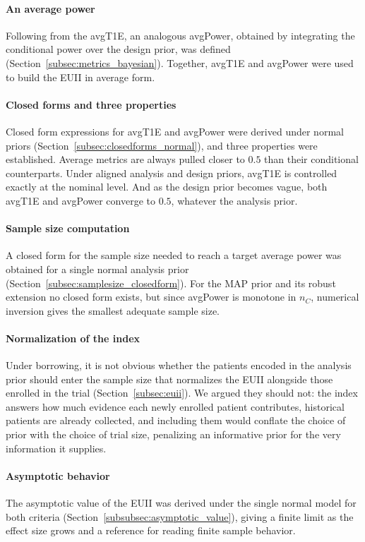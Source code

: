 \paragraph{An average power}
Following from the avgT1E, an analogous avgPower, obtained by integrating
the conditional power over the design prior, was defined
(Section~\ref{subsec:metrics_bayesian}). Together, avgT1E and avgPower were used to build the EUII in
average form.

\paragraph{Closed forms and three properties}
Closed form expressions for avgT1E and avgPower were derived under normal priors
(Section~\ref{subsec:closedforms_normal}), and three
properties were established. Average metrics are always pulled closer to $0.5$ than their conditional counterparts.
Under aligned analysis and design priors, avgT1E is controlled exactly at the nominal level. And as
the design prior becomes vague, both avgT1E and avgPower converge to $0.5$, whatever the analysis
prior.

\paragraph{Sample size computation}
A closed form for the sample size needed to reach a target average power was obtained for a single
normal analysis prior (Section~\ref{subsec:samplesize_closedform}). For the MAP prior and its robust
extension no closed form exists, but since
avgPower is monotone in $n_C$, numerical inversion gives the smallest adequate sample size.

\paragraph{Normalization of the index}
Under borrowing, it is not obvious whether the patients encoded in the analysis prior should enter the
sample size that normalizes the EUII alongside those enrolled in the trial
(Section~\ref{subsec:euii}). We argued they should not:
the index answers how much evidence each newly enrolled patient contributes, historical patients are
already collected, and including them would conflate the choice of prior with the choice of trial
size, penalizing an informative prior for the very information it supplies.

\paragraph{Asymptotic behavior}
The asymptotic value of the EUII was derived under the single normal model for both criteria
(Section~\ref{subsubsec:asymptotic_value}), giving a
finite limit as the effect size grows and a reference for reading finite sample behavior.

